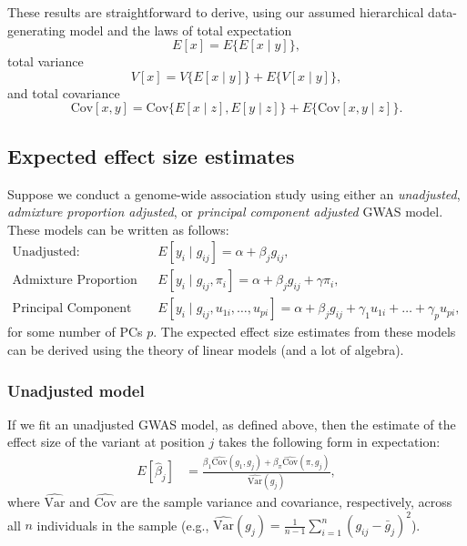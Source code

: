 \documentclass[12pt]{article}
\begin{document}
These results are straightforward to derive, using our assumed hierarchical data-generating model and the laws of total expectation $$E[x] = E\{E[x\mid y]\},$$ total variance $$V[x] = V\{E[x\mid y]\} + E\{ V[x \mid y] \},$$ and total covariance $$\text{Cov}[x,y] = \text{Cov}\{E[x\mid z], E[y\mid z]\} + E\{ \text{Cov}[x,y \mid z] \}.$$

\subsection{Expected effect size estimates}
\label{sec:expectedbetas}

Suppose we conduct a genome-wide association study using either an \textit{unadjusted}, \textit{admixture proportion adjusted}, or \textit{principal component adjusted} GWAS model. 
These models can be written as follows:
\begin{align*}
\text{Unadjusted: } & E[y_i \mid g_{ij}] = \alpha + \beta_j g_{ij}, \\
\text{Admixture Proportion Adjusted: } & E[y_i \mid g_{ij}, \pi_i] = \alpha + \beta_j g_{ij} + \gamma \pi_i,\\
\text{Principal Component Adjusted: } & E[y_i \mid g_{ij}, u_{1i}, \dots, u_{pi}] = \alpha + \beta_j g_{ij} + \gamma_1 u_{1i} + \dots + \gamma_p u_{pi},
\end{align*}
for some number of PCs $p$. 
The expected effect size estimates from these models  can be derived using the theory of linear models (and a lot of algebra).

\subsubsection{Unadjusted model}

If we fit an unadjusted GWAS model, as defined above, then the estimate of the effect size of the variant at position $j$ takes the following form in expectation:
\begin{align*}
E[\hat\beta_j] & = \frac{\beta_1 \widehat{\text{Cov}}(g_{1},g_{j}) + \beta_\pi \widehat{\text{Cov}}(\pi, g_{j})}{\widehat{\text{Var}}(g_{j})},
\end{align*}
where $\widehat{\text{Var}}$ and $\widehat{\text{Cov}}$ are the sample variance and covariance, respectively, across all $n$ individuals in the sample (e.g., $\widehat{\text{Var}}(g_j) = \frac{1}{n-1}\sum_{i=1}^n (g_{ij} - \bar{g}_j)^2$).
\end{document}
